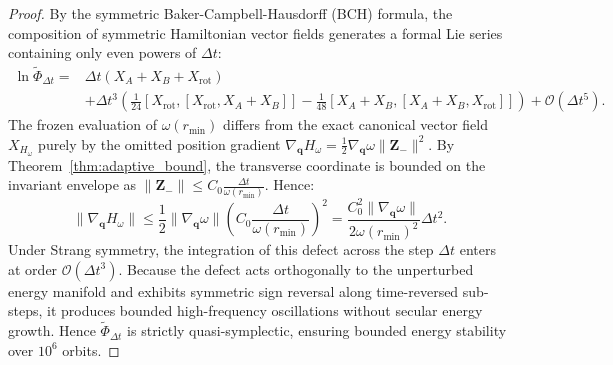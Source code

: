 \documentclass[11pt,a4paper,reqno]{article}
\theoremstyle{plain}
\theoremstyle{definition}
\theoremstyle{remark}
\numberwithin{equation}{section}
\begin{document}
\begin{proof}
By the symmetric Baker-Campbell-Hausdorff (BCH) formula, the composition of symmetric Hamiltonian vector fields generates a formal Lie series containing only even powers of $\Delta t$:
\begin{equation}
\begin{split}
\ln \widetilde{\Phi}_{\Delta t} ={}& \Delta t (X_A + X_B + X_{\mathrm{rot}}) \\
& + \Delta t^3 \left( \frac{1}{24} [X_{\mathrm{rot}}, [X_{\mathrm{rot}}, X_A + X_B]] - \frac{1}{48} [X_A + X_B, [X_A + X_B, X_{\mathrm{rot}}]] \right) + \mathcal{O}(\Delta t^5).
\end{split}
\end{equation}
The frozen evaluation of $\omega(r_{\min})$ differs from the exact canonical vector field $X_{H_\omega}$ purely by the omitted position gradient $\nabla_{\bm{q}} H_\omega = \frac{1}{2} \nabla_{\bm{q}} \omega \|\bm{Z}_-\|^2$. By Theorem~\ref{thm:adaptive_bound}, the transverse coordinate is bounded on the invariant envelope as $\|\bm{Z}_-\| \le C_0 \frac{\Delta t}{\omega(r_{\min})}$. Hence:
\begin{equation}
\|\nabla_{\bm{q}} H_\omega\| \le \frac{1}{2} \|\nabla_{\bm{q}} \omega\| \left( C_0 \frac{\Delta t}{\omega(r_{\min})} \right)^2 = \frac{C_0^2 \|\nabla_{\bm{q}} \omega\|}{2 \omega(r_{\min})^2} \Delta t^2.
\end{equation}
Under Strang symmetry, the integration of this defect across the step $\Delta t$ enters at order $\mathcal{O}(\Delta t^3)$. Because the defect acts orthogonally to the unperturbed energy manifold and exhibits symmetric sign reversal along time-reversed sub-steps, it produces bounded high-frequency oscillations without secular energy growth. Hence $\widetilde{\Phi}_{\Delta t}$ is strictly quasi-symplectic, ensuring bounded energy stability over $10^6$ orbits.
\end{proof}
\end{document}
